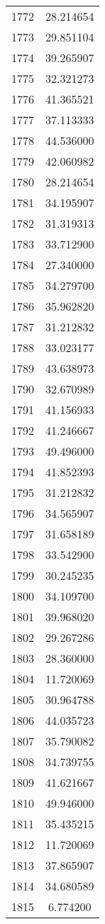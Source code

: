 \documentclass[12pt]{article}
\begin{document}
\begin{longtable}{@{}cc@{}}
1772 & 28.214654 \\
1773 & 29.851104 \\
1774 & 39.265907 \\
1775 & 32.321273 \\
1776 & 41.365521 \\
1777 & 37.113333 \\
1778 & 44.536000 \\
1779 & 42.060982 \\
1780 & 28.214654 \\
1781 & 34.195907 \\
1782 & 31.319313 \\
1783 & 33.712900 \\
1784 & 27.340000 \\
1785 & 34.279700 \\
1786 & 35.962820 \\
1787 & 31.212832 \\
1788 & 33.023177 \\
1789 & 43.638973 \\
1790 & 32.670989 \\
1791 & 41.156933 \\
1792 & 41.246667 \\
1793 & 49.496000 \\
1794 & 41.852393 \\
1795 & 31.212832 \\
1796 & 34.565907 \\
1797 & 31.658189 \\
1798 & 33.542900 \\
1799 & 30.245235 \\
1800 & 34.109700 \\
1801 & 39.968020 \\
1802 & 29.267286 \\
1803 & 28.360000 \\
1804 & 11.720069 \\
1805 & 30.964788 \\
1806 & 44.035723 \\
1807 & 35.790082 \\
1808 & 34.739755 \\
1809 & 41.621667 \\
1810 & 49.946000 \\
1811 & 35.435215 \\
1812 & 11.720069 \\
1813 & 37.865907 \\
1814 & 34.680589 \\
1815 & 6.774200 \\

\end{longtable}
\end{document}

